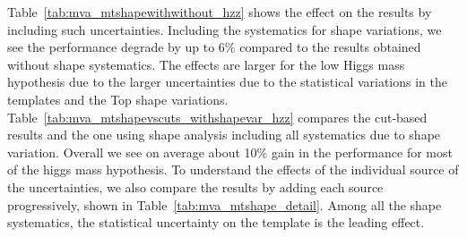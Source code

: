 Table~\ref{tab:mva_mtshapewithwithout_hzz} shows the effect on the results by including such uncertainties. 
Including the systematics for shape variations, we see the performance degrade by up to 6\% compared 
to the results obtained without shape systematics. 
The effects are larger for the low Higgs mass hypothesis due to the larger uncertainties due to the 
statistical variations in the templates and the Top shape variations. 
Table~\ref{tab:mva_mtshapevscuts_withshapevar_hzz} compares the cut-based results and the one using 
shape analysis including all systematics due to shape variation. 
Overall we see on average about 10\% gain in the performance for most of the 
higgs mass hypothesis. 
To understand the effects of the individual source of the uncertainties, 
we also compare the results by adding each source progressively, shown in Table~\ref{tab:mva_mtshape_detail}. 
Among all the shape systematics, the statistical uncertainty on the template is the leading effect. 



